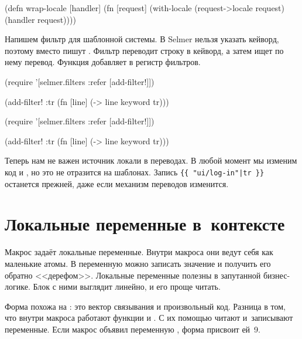 \else

\begin{clojure}
(defn wrap-locale [handler]
  (fn [request]
    (with-locale (request->locale request)
      (handler request))))
\end{clojure}

\fi

Напишем фильтр  для шаблонной системы. В Selmer нельзя указать кейворд,
поэтому вместо  пишут .  Фильтр
 переводит строку в кейворд, а затем ищет по нему перевод. Функция
 добавляет  в регистр фильтров.

\ifnarrow

\begin{clojure}
(require
 '[selmer.filters :refer [add-filter!]])

(add-filter! :tr
 (fn [line]
   (-> line keyword tr)))
\end{clojure}

\else

\begin{clojure}
(require '[selmer.filters :refer [add-filter!]])

(add-filter! :tr
 (fn [line]
   (-> line keyword tr)))
\end{clojure}

\fi

Теперь нам не важен источник локали в переводах. В любой момент мы изменим код
 и , но это не отразится на
шаблонах. Запись \verb={{ "ui/log-in"|tr }}= останется прежней, даже если
механизм переводов изменится.

\section{Локальные переменные в~контексте}


Макрос  задаёт локальные переменные. Внутри макроса они
ведут себя как маленькие атомы. В переменную можно записать значение и получить
его обратно <<дерефом>>. Локальные переменные полезны в запутанной
бизнес-логике. Блок с ними выглядит линейно, и его проще читать.

Форма  похожа на : это вектор связывания и
произвольный код. Разница в том, что внутри макроса работают функции
 и . С их помощью читают и~записывают
переменные. Если макрос объявил переменную , форма 
присвоит ей~9.

